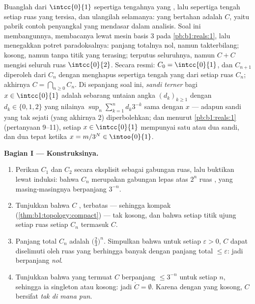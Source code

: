 \begin{problem}[{Soal akhir pekan --- \omterm{pb:b1:topology:1}{himpunan Cantor} sepertiga
tengah: panjang nol, takterbilang, sempurna, dan $C + C =
\intcc{0}{2}$}]
\label{pb:b1:topology:1}
Buanglah dari $\intcc{0}{1}$ sepertiga tengahnya yang , lalu sepertiga
tengah setiap ruas yang tersisa, dan ulangilah selamanya: yang
bertahan adalah \emph{} $C$, yaitu pabrik
contoh penyangkal yang mendasar dalam analisis. Soal ini membangunnya,
membacanya lewat mesin basis $3$ pada \cref{pb:b1:reals:1},
lalu menegakkan potret paradoksalnya: panjang totalnya nol, namun
takterbilang;  kosong, namun tanpa titik yang terasing; terputus
seluruhnya, namun $C + C$ mengisi seluruh ruas
$\intcc{0}{2}$. Secara resmi: $C_0 = \intcc{0}{1}$,
dan $C_{n+1}$ diperoleh dari $C_n$ dengan menghapus sepertiga tengah
yang  dari setiap ruas $C_n$; akhirnya $C = \bigcap_{n \geq 0}
C_n$. Di sepanjang soal ini, \emph{sandi terner} bagi $x \in \intcc{0}{1}$
adalah sebarang untaian angka $(d_k)_{k\geq1}$ dengan $d_k \in \{0, 1, 2\}$
yang nilainya $\sup_n \sum_{k=1}^n d_k 3^{-k}$ sama dengan $x$ ---
adapun sandi yang tak sejati (yang akhirnya $2$) diperbolehkan; dan menurut
\cref{pb:b1:reals:1} (pertanyaan 9--11), setiap $x \in
\intcc{0}{1}$ mempunyai satu atau dua sandi, dan dua tepat ketika $x = m/3^N
\in \intoo{0}{1}$.

\medskip
\noindent\textbf{Bagian I --- Konstruksinya.}
\begin{enumerate}
  \item Perikan $C_1$ dan $C_2$ secara eksplisit sebagai gabungan
        ruas, lalu buktikan lewat induksi: bahwa $C_n$ merupakan gabungan
        lepas atas $2^n$ ruas , yang masing-masingnya berpanjang $3^{-n}$.
  \item Tunjukkan bahwa $C$ , terbatas --- sehingga kompak
        (\cref{thm:b1:topology:compact}) --- tak kosong, dan bahwa
        setiap titik ujung setiap ruas setiap $C_n$ termasuk
        $C$.
  \item Panjang total $C_n$ adalah $\bigl(\frac23\bigr)^n$.
        Simpulkan bahwa untuk setiap $\varepsilon > 0$,  $C$ dapat
        diselimuti oleh ruas yang berhingga banyak dengan panjang total
        $\leq \varepsilon$: jadi  berpanjang \emph{nol}.
  \item Tunjukkan bahwa  yang termuat $C$ berpanjang $\leq
        3^{-n}$ untuk setiap $n$, sehingga ia singleton atau kosong:
        jadi $\mathring C = \emptyset$. Karena  dengan 
        yang kosong, $C$ bersifat \emph{tak  di mana pun}.
\end{enumerate}


\end{problem}
